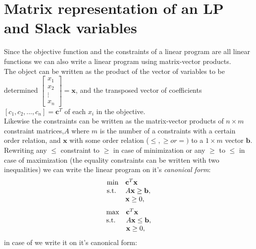 \section{Matrix representation of an LP and Slack variables}
Since the objective function and the constraints of a linear program are all linear functions we can also write a linear program using matrix-vector products. \\
The object can be written as the product of the vector of variables to be determined 
$\begin{bmatrix}x_{1} \\           x_{2} \\
\vdots \\
x_{n}
\end{bmatrix}=\textbf{x}$, and the transposed vector of coefficients $[c_1,c_2,...,c_n]=\textbf{c}^T$ of each $x_i$ in the objective.\\
Likewise the constraints can be written as the matrix-vector products of $n\times m$ constraint matrices,$A$ where $m$ is the number of a constraints with a certain order relation, and $\textbf{x}$ with some order relation ($\leq,\geq or =)$ to a $1\times m$ vector $\textbf{b}$.\\
Rewriting any $\leq$ constraint to $\geq$ in case of minimization or any $\geq$ to $\leq$ in case of maximization (the equality constraints can be written with two inequalities) we can write the linear program on it's \textit{canonical form}:
\begin{align}\label{canonicalMin}
\begin{array}{ll@{}ll}
\text{min} &\textbf{c}^T\textbf{x}&\\
\text{s.t.} &A\textbf{x} \geq \textbf{b},&\\
&\textbf{x} \geq 0,&\\
\end{array}
\end{align}
\begin{align}\label{canonicalMax}
\begin{array}{ll@{}ll}
\text{max} &\textbf{c}^T\textbf{x}&\\
\text{s.t.} &A\textbf{x} \leq \textbf{b},&\\
&\textbf{x} \geq 0,&\\
\end{array}
\end{align}
in case of  we write it on it's canonical form:
